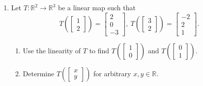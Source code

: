 \documentclass[12pt]{amsart}
\newcommand{\R}{\mathbb{R}}
\begin{document}
\begin{enumerate}
\item
 Let $T\colon\R^2\to\R^3$ be a linear map such that 
\[ T(\left[\begin{matrix} 1 \\ 2 \end{matrix}\right]) = \left[\begin{matrix} 2 \\ 0 \\ -3 \end{matrix}\right],\ T(\left[\begin{matrix} 3 \\ 2 \end{matrix}\right]) = \left[\begin{matrix} -2 \\ 2 \\ 1 \end{matrix}\right]. \]
\begin{enumerate}
\item
 Use the linearity of $T$ to find $T(\left[\begin{matrix} 1 \\ 0 \end{matrix}\right])$ and $T(\left[\begin{matrix} 0 \\ 1 \end{matrix}\right])$.
\item
 Determine $T(\left[\begin{matrix} x \\ y \end{matrix}\right])$ for arbitrary $x,y\in\R$.
\end{enumerate}



\end{enumerate}
\end{document}
